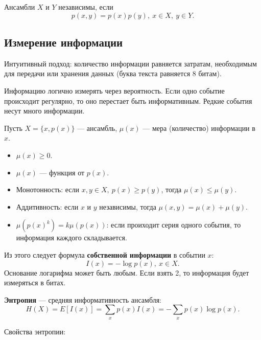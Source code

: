 Ансамбли $X$ и $Y$ независимы, если
\[
    p(x, y) = p(x)p(y),\ x \in X,\ y \in Y.
\]

\subsection{Измерение информации}

Интуитивный подход: количество информации равняется затратам, необходимым
для передачи или хранения данных (буква текста равняется 8 битам).

Информацию логично измерять через вероятность. Если одно событие происходит
регулярно, то оно перестает быть информативным. Редкие события несут много
информации.

Пусть $X = \{ x, p(x) \}$ --- ансамбль, $\mu(x)$ --- мера (количество)
информации в $x$.

\begin{itemize}
    \item $\mu(x) \geq 0$.
    \item $\mu(x)$ --- функция от $p(x)$.
    \item Монотонность: если $x, y \in X,\ p(x) \geq p(y)$, тогда $\mu(x) \leq
        \mu(y)$.
    \item Аддитивность: если $x$ и $y$ независимы, тогда $\mu(x,y) = \mu(x) +
        \mu(y)$.
    \item $\mu(p(x)^k) = k\mu(p(x))$: если проиходит серия одного события, то
        информация каждого складывается.
\end{itemize}

Из этого следует формула \textbf{собственной информации} в событии $x$:
\[
    I(x) = - \log p(x),\ x \in X.
\]
Основание логарифма может быть любым. Если взять 2, то информация будет
измеряться в битах.

\textbf{Энтропия} --- средняя информативность ансамбля:
\[
    H(X) = E[I(x)] = \sum_x p(x) I(x) = - \sum_x p(x) \log p(x).
\]

Свойства энтропии:

